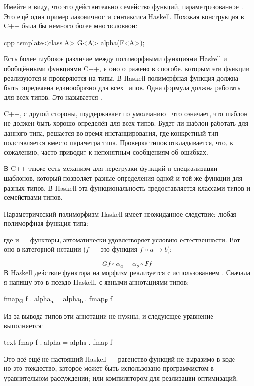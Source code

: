 Имейте в виду, что это действительно семейство функций, параметризованное
. Это ещё один пример лаконичности синтаксиса Haskell.
Похожая конструкция в C++ была бы немного более многословной:

\begin{snip}{cpp}
template<class A> G<A> alpha(F<A>);
\end{snip}
Есть более глубокое различие между полиморфными функциями Haskell
и обобщёнными функциями C++, и оно отражено в способе, которым эти
функции реализуются и проверяются на типы. В Haskell полиморфная
функция должна быть определена единообразно для всех типов. Одна формула должна работать
для всех типов. Это называется .

C++, с другой стороны, поддерживает по умолчанию ,
что означает, что шаблон не должен быть хорошо определён для всех
типов. Будет ли шаблон работать для данного типа, решается во время
инстанцирования, где конкретный тип подставляется вместо параметра типа.
Проверка типов откладывается, что, к сожалению, часто приводит к
непонятным сообщениям об ошибках.

В C++ также есть механизм для перегрузки функций и
специализации шаблонов, который позволяет разные определения одной и той же функции
для разных типов. В Haskell эта функциональность предоставляется классами типов
и семействами типов.

Параметрический полиморфизм Haskell имеет неожиданное следствие: любая
полиморфная функция типа:

где  и  --- функторы, автоматически удовлетворяет
условию естественности. Вот оно в категорной нотации ($f$
--- это функция $f \Colon a \to b$):

\[G f \circ \alpha_a = \alpha_b \circ F f\]
В Haskell действие функтора  на морфизм 
реализуется с использованием . Сначала я напишу это в
псевдо-Haskell, с явными аннотациями типов:

\begin{snipv}
fmap\textsubscript{G} f . alpha\textsubscript{a} = alpha\textsubscript{b} . fmap\textsubscript{F} f
\end{snipv}
Из-за вывода типов эти аннотации не нужны, и
следующее уравнение выполняется:

\begin{snip}{text}
fmap f . alpha = alpha . fmap f
\end{snip}
Это всё ещё не настоящий Haskell --- равенство функций не выразимо
в коде --- но это тождество, которое может быть использовано программистом в
уравнительном рассуждении; или компилятором для реализации оптимизаций.

